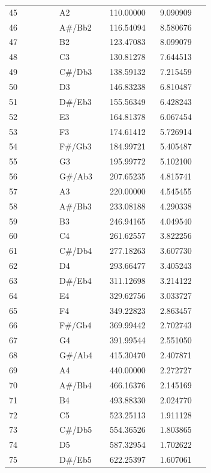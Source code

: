 \documentclass[11pt,a4paper]{article}
\begin{document}
\begin{longtable}{@{}p{0.2200\linewidth}p{0.2200\linewidth}p{0.2200\linewidth}p{0.2200\linewidth}@{}}
45 & A2 & 110.00000 & 9.090909 \\
46 & A\#/\allowbreak{}Bb2 & 116.54094 & 8.580676 \\
47 & B2 & 123.47083 & 8.099079 \\
48 & C3 & 130.81278 & 7.644513 \\
49 & C\#/\allowbreak{}Db3 & 138.59132 & 7.215459 \\
50 & D3 & 146.83238 & 6.810487 \\
51 & D\#/\allowbreak{}Eb3 & 155.56349 & 6.428243 \\
52 & E3 & 164.81378 & 6.067454 \\
53 & F3 & 174.61412 & 5.726914 \\
54 & F\#/\allowbreak{}Gb3 & 184.99721 & 5.405487 \\
55 & G3 & 195.99772 & 5.102100 \\
56 & G\#/\allowbreak{}Ab3 & 207.65235 & 4.815741 \\
57 & A3 & 220.00000 & 4.545455 \\
58 & A\#/\allowbreak{}Bb3 & 233.08188 & 4.290338 \\
59 & B3 & 246.94165 & 4.049540 \\
60 & C4 & 261.62557 & 3.822256 \\
61 & C\#/\allowbreak{}Db4 & 277.18263 & 3.607730 \\
62 & D4 & 293.66477 & 3.405243 \\
63 & D\#/\allowbreak{}Eb4 & 311.12698 & 3.214122 \\
64 & E4 & 329.62756 & 3.033727 \\
65 & F4 & 349.22823 & 2.863457 \\
66 & F\#/\allowbreak{}Gb4 & 369.99442 & 2.702743 \\
67 & G4 & 391.99544 & 2.551050 \\
68 & G\#/\allowbreak{}Ab4 & 415.30470 & 2.407871 \\
69 & A4 & 440.00000 & 2.272727 \\
70 & A\#/\allowbreak{}Bb4 & 466.16376 & 2.145169 \\
71 & B4 & 493.88330 & 2.024770 \\
72 & C5 & 523.25113 & 1.911128 \\
73 & C\#/\allowbreak{}Db5 & 554.36526 & 1.803865 \\
74 & D5 & 587.32954 & 1.702622 \\
75 & D\#/\allowbreak{}Eb5 & 622.25397 & 1.607061 \\
\bottomrule\end{longtable}\endgroup
\end{document}
